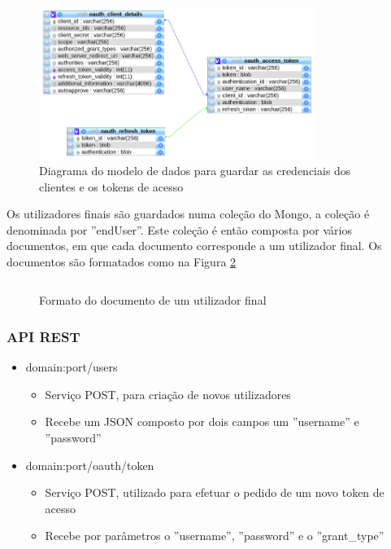  \begin{figure}[H]
  \centering
  \includegraphics[width=0.8\textwidth]{imgs/auth-diagram.png}
  \caption[Diagrama do modelo de dados para guardar as credenciais dos clientes e os tokens de acesso]{Diagrama do modelo de dados para guardar as credenciais dos clientes e os tokens de acesso}
  
  \label{f:auth-diagram}
\end{figure}


Os utilizadores finais são guardados numa coleção do Mongo, a coleção é denominada por ''endUser''. Este coleção é então composta por vários documentos, em que cada documento corresponde a um utilizador final. Os documentos são formatados como na Figura \ref{f:endUserCode}

\begin{figure}[H]

\inputminted[fontsize=\scriptsize]{json}{code/endUser.json}
\caption[Formato do documento de um utilizador final]{Formato do documento de um utilizador final}
\label{f:endUserCode}
\end{figure}
\subsubsection{API REST}
\begin{itemize}
    \item domain:port/users
        \begin{itemize}
            \item Serviço POST, para criação de novos utilizadores
            \item Recebe um JSON composto por dois campos um ''username'' e ''password''
        \end{itemize}
    \item domain:port/oauth/token
        \begin{itemize}
            \item Serviço POST, utilizado para efetuar o pedido de um novo token de acesso
            \item Recebe por parâmetros o ''username'', ''password'' e o ''grant\_type''
        \end{itemize}
\end{itemize}  

